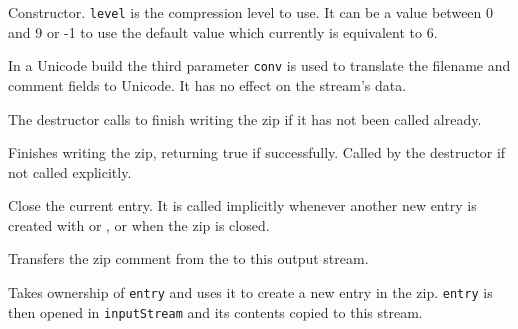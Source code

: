 
Constructor. {\tt level} is the compression level to use.
It can be a value between 0 and 9 or -1 to use the default value
which currently is equivalent to 6.

In a Unicode build the third parameter {\tt conv} is used to translate
the filename and comment fields to Unicode. It has no effect on the
stream's data.


\label{wxzipoutputstreamdtor}


The destructor calls  to finish
writing the zip if it has not been called already.


\label{wxzipoutputstreamclose}


Finishes writing the zip, returning true if successfully.
Called by the destructor if not called explicitly.


\label{wxzipoutputstreamcloseentry}


Close the current entry. It is called implicitly whenever another new
entry is created with 
or , or
when the zip is closed.


\label{wxzipoutputstreamcopyarchivemetadata}


Transfers the zip comment from the 
to this output stream.


\label{wxzipoutputstreamcopyentry}


Takes ownership of {\tt entry} and uses it to create a new entry
in the zip. {\tt entry} is then opened in {\tt inputStream} and its contents
copied to this stream.

